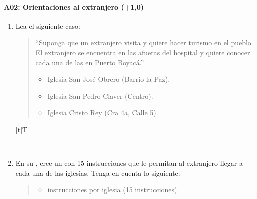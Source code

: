 \documentclass[letterpaper,10pt,spanish]{sphinxmanual}
\let\sphinxpxdimen\pdfpxdimen\else\newdimen\sphinxpxdimen
\begin{document}
\paragraph{A02: Orientaciones al extranjero (+1,0)}
\label{\detokenize{cursos/ofimatica11/periodo01/G02:a02-orientaciones-al-extranjero-1-0}}
\sphinxAtStartPar
{}
\begin{enumerate}
%
\item {} 
\sphinxAtStartPar
Lea el siguiente caso:
\begin{quote}

\sphinxAtStartPar
“Suponga que un extranjero visita  y quiere hacer turismo en el pueblo.
El extranjero se encuentra en las afueras del hospital  y quiere conocer cada una de las  en Puerto Boyacá.”
\begin{itemize}
\item {} 
\sphinxAtStartPar
Iglesia San José Obrero (Barrio la Paz).

\item {} 
\sphinxAtStartPar
Iglesia San Pedro Claver (Centro).

\item {} 
\sphinxAtStartPar
Iglesia Cristo Rey (Cra 4a, Calle 5).

\end{itemize}
\end{quote}


\begin{savenotes}\sphinxattablestart
\sphinxthistablewithglobalstyle
\centering
\begin{tabulary}{\linewidth}[t]{T}
\sphinxtoprule
\sphinxtableatstartofbodyhook

\begin{sphinxfigure-in-table}
\centering
\capstart
\noindent\sphinxincludegraphics[width=650\sphinxpxdimen]{{image043}.png}
\label{\detokenize{cursos/ofimatica11/periodo01/G02:id1}}\end{sphinxfigure-in-table}\relax
\\
\sphinxbottomrule
\end{tabulary}
\sphinxtableafterendhook\par
\sphinxattableend\end{savenotes}

\item {} 
\sphinxAtStartPar
En su , cree un  con 15 instrucciones que le permitan al extranjero llegar a cada una de las iglesias. Tenga en cuenta lo siguiente:
\begin{quote}
\begin{itemize}
\item {} 
 instrucciones por iglesia (15 instrucciones).


\end{itemize}
\end{quote}
\end{enumerate}
\end{document}
